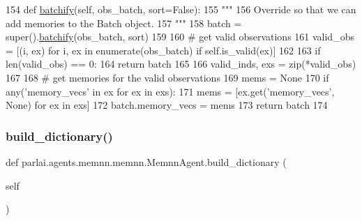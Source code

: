 \begin{DoxyCode}
154     \textcolor{keyword}{def }\hyperlink{namespaceparlai_1_1agents_1_1drqa_1_1utils_aca22dd97c5b6dcda2a7479c1cb22ef1e}{batchify}(self, obs\_batch, sort=False):
155         \textcolor{stringliteral}{"""}
156 \textcolor{stringliteral}{        Override so that we can add memories to the Batch object.}
157 \textcolor{stringliteral}{        """}
158         batch = super().\hyperlink{namespaceparlai_1_1agents_1_1drqa_1_1utils_aca22dd97c5b6dcda2a7479c1cb22ef1e}{batchify}(obs\_batch, sort)
159 
160         \textcolor{comment}{# get valid observations}
161         valid\_obs = [(i, ex) \textcolor{keywordflow}{for} i, ex \textcolor{keywordflow}{in} enumerate(obs\_batch) \textcolor{keywordflow}{if} self.is\_valid(ex)]
162 
163         \textcolor{keywordflow}{if} len(valid\_obs) == 0:
164             \textcolor{keywordflow}{return} batch
165 
166         valid\_inds, exs = zip(*valid\_obs)
167 
168         \textcolor{comment}{# get memories for the valid observations}
169         mems = \textcolor{keywordtype}{None}
170         \textcolor{keywordflow}{if} any(\textcolor{stringliteral}{'memory\_vecs'} \textcolor{keywordflow}{in} ex \textcolor{keywordflow}{for} ex \textcolor{keywordflow}{in} exs):
171             mems = [ex.get(\textcolor{stringliteral}{'memory\_vecs'}, \textcolor{keywordtype}{None}) \textcolor{keywordflow}{for} ex \textcolor{keywordflow}{in} exs]
172         batch.memory\_vecs = mems
173         \textcolor{keywordflow}{return} batch
174 
\end{DoxyCode}
\mbox{\label{classparlai_1_1agents_1_1memnn_1_1memnn_1_1MemnnAgent_af314871636896b61139ef761765a1872}} 
\subsubsection{\texorpdfstring{build\+\_\+dictionary()}{build\_dictionary()}}
{\footnotesize\ttfamily def parlai.\+agents.\+memnn.\+memnn.\+Memnn\+Agent.\+build\+\_\+dictionary (\begin{DoxyParamCaption}\item[{}]{self }\end{DoxyParamCaption})}

